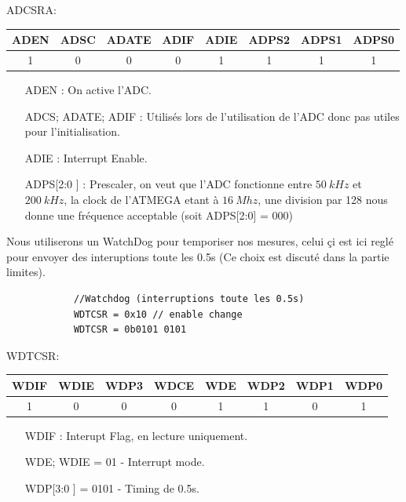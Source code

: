 \documentclass[a4paper, 12pt]{article}
\begin{document}
		ADCSRA:
		\begin{center}
			\begin{tabular}{|c|c|c|c|c|c|c|c|}
				\hline
				ADEN & ADSC & ADATE & ADIF & ADIE & ADPS2 & ADPS1 & ADPS0\\
				\hline
				1 & 0 & 0 & 0 & 1 & 1 & 1 & 1\\
				\hline
			\end{tabular}
		\end{center}
		\begin{itemize}
			\item[ADEN] : On active l'ADC.
			\item[ADCS; ADATE; ADIF] : Utilisés lors de l'utilisation de l'ADC donc pas utiles pour l'initialisation.
			\item[ADIE] : Interrupt Enable.
			\item[ADPS[2:0]] : Prescaler, on veut que l'ADC fonctionne entre $50\ kHz$ et $200\ kHz$, la clock de l'ATMEGA etant à $16\ Mhz$, une division par 128 nous donne une fréquence acceptable (soit ADPS[2:0] = 000)
		\end{itemize}
		
		Nous utiliserons un WatchDog pour temporiser nos mesures, celui çi est ici reglé pour envoyer des interuptions toute les 0.5s (Ce choix est discuté dans la partie limites).
		\begin{lstlisting}
			//Watchdog (interruptions toute les 0.5s)
			WDTCSR = 0x10 // enable change
			WDTCSR = 0b0101 0101
		\end{lstlisting}
		WDTCSR:
		\begin{center}
			\begin{tabular}{|c|c|c|c|c|c|c|c|}
				\hline
				WDIF & WDIE & WDP3 & WDCE & WDE & WDP2 & WDP1 & WDP0\\
				\hline
				1 & 0 & 0 & 0 & 1 & 1 & 0 & 1\\
				\hline
			\end{tabular}
		\end{center}
		\begin{itemize}
			\item[WDIF] : Interupt Flag, en lecture uniquement.
			\item[WDE; WDIE] = 01 - Interrupt mode.
			\item[WDP[3:0]] = 0101 - Timing de 0.5s.
		\end{itemize}
\end{document}
